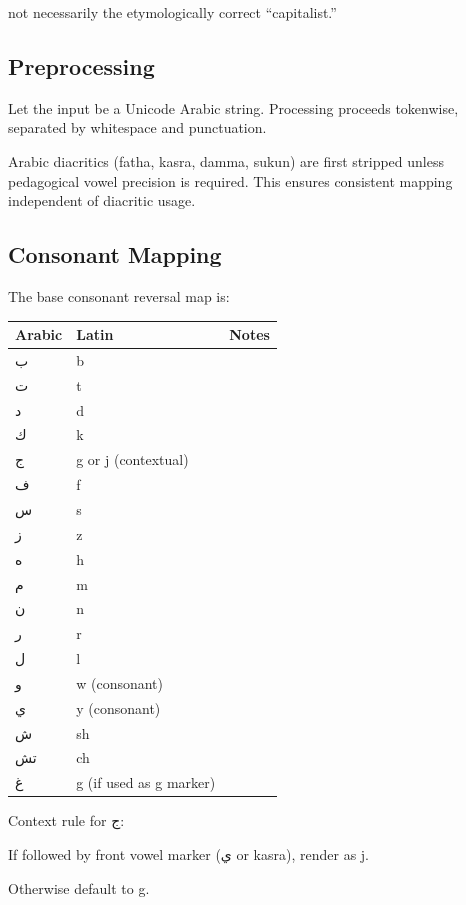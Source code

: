 \documentclass[12pt]{article}
\newcommand{\AR}[1]{\foreignlanguage{arabic}{#1}}
\begin{document}
not necessarily the etymologically correct ``capitalist.''

\subsection{Preprocessing}

Let the input be a Unicode Arabic string. Processing proceeds tokenwise, separated by whitespace and punctuation.

Arabic diacritics (fatha, kasra, damma, sukun) are first stripped unless pedagogical vowel precision is required. This ensures consistent mapping independent of diacritic usage.

\subsection{Consonant Mapping}

The base consonant reversal map is:

\begin{center}
\begin{tabular}{lll}
Arabic & Latin & Notes \\
\hline
\AR{ب} & b \\
\AR{ت} & t \\
\AR{د} & d \\
\AR{ك} & k \\
\AR{ج} & g or j (contextual) \\
\AR{ف} & f \\
\AR{س} & s \\
\AR{ز} & z \\
\AR{ه} & h \\
\AR{م} & m \\
\AR{ن} & n \\
\AR{ر} & r \\
\AR{ل} & l \\
\AR{و} & w (consonant) \\
\AR{ي} & y (consonant) \\
\AR{ش} & sh \\
\AR{تش} & ch \\
\AR{غ} & g (if used as g marker) \\
\end{tabular}
\end{center}

Context rule for \AR{ج}:

If followed by front vowel marker (\AR{ي} or kasra), render as j.

Otherwise default to g.
\end{document}
